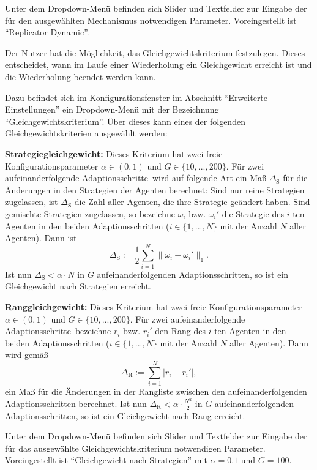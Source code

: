 \documentclass[parskip=full,11pt]{scrartcl}
\def\adapts{Adaptionsschritte}
\begin{document}
Unter dem Dropdown-Menü befinden sich Slider und Textfelder zur Eingabe der für den ausgewählten Mechanismus notwendigen Parameter. Voreingestellt ist \enquote{Replicator Dynamic}.

Der Nutzer hat die Möglichkeit, das Gleichgewichtskriterium festzulegen. Dieses entscheidet, wann im Laufe einer Wiederholung ein Gleichgewicht erreicht ist und die Wiederholung beendet werden kann.

Dazu befindet sich im Konfigurationsfenster im Abschnitt \enquote{Erweiterte Einstellungen} ein Dropdown-Menü mit der Bezeichnung \enquote{Gleichgewichtskriterium}. Über dieses kann eines der folgenden Gleichgewichtskriterien ausgewählt werden:

\textbf{Strategiegleichgewicht:}
Dieses Kriterium hat zwei freie Konfigurationsparameter \(\alpha \in (0,1)\) und \(G \in \{10,...,200\}\). Für zwei aufeinanderfolgende \adapts\ wird auf folgende Art ein Maß \(\Delta_\text{S}\) für die Änderungen in den Strategien der Agenten berechnet: Sind nur reine Strategien zugelassen, ist \(\Delta_\text{S}\)  die Zahl aller Agenten, die ihre Strategie geändert haben. Sind gemischte Strategien zugelassen, so bezeichne \(\omega_i\) bzw. \(\omega_i'\) die Strategie des \(i\)-ten Agenten in den beiden \adapts n (\(i \in \{1,...,N\}\) mit der Anzahl \(N\) aller Agenten). Dann ist
\[
\Delta_\text{S} :=\frac 12 \sum_{i=1}^N \|\omega_i - \omega_i'\|_1.
\]
Ist nun \(\Delta_\text{S} < \alpha \cdot N\) in \(G\) aufeinanderfolgenden \adapts n, so ist ein Gleichgewicht nach Strategien erreicht.

\textbf{Ranggleichgewicht:}
Dieses Kriterium hat zwei freie Konfigurationsparameter \(\alpha \in (0,1)\) und \(G \in \{10,...,200\}\). Für zwei aufeinanderfolgende \adapts\ bezeichne \(r_i\) bzw. \(r_i'\) den Rang des \(i\)-ten Agenten in den beiden \adapts n (\(i \in \{1,...,N\}\) mit der Anzahl \(N\) aller Agenten). Dann wird gemäß
\[
\Delta_\text{R} := \sum_{i=1}^N |r_i - r_i'|,
\]
ein Maß für die Änderungen in der Rangliste zwischen den aufeinanderfolgenden \adapts n berechnet. Ist nun \(\Delta_\text{R} < \alpha \cdot \frac{N^2}{2}\) in \(G\) aufeinanderfolgenden \adapts n, so ist ein Gleichgewicht nach Rang erreicht.

Unter dem Dropdown-Menü befinden sich Slider und Textfelder zur Eingabe der für das ausgewählte Gleichgewichtskriterium notwendigen Parameter. Voreingestellt ist \enquote{Gleichgewicht nach Strategien} mit \(\alpha = 0.1\) und \(G = 100\).
\end{document}
